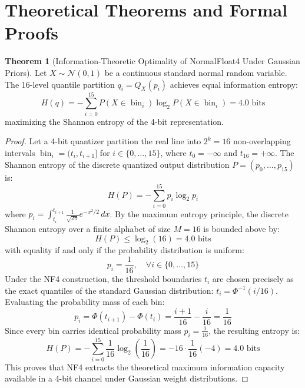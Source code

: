 \documentclass[11pt,a4paper]{article}
\theoremstyle{definition}
\newtheorem{theorem}{\textbf{Theorem}}[section]
\begin{document}
\section{Theoretical Theorems and Formal Proofs}

\begin{theorem}[Information-Theoretic Optimality of NormalFloat4 Under Gaussian Priors]
Let $X \sim \mathcal{N}(0, 1)$ be a continuous standard normal random variable. The 16-level quantile partition $q_i = Q_X(p_i)$ achieves equal information entropy:
{\boldmath
\begin{equation}
H(q) = -\sum_{i=0}^{15} P(X \in \operatorname{bin}_i) \log_2 P(X \in \operatorname{bin}_i) = 4.0 \text{ bits}
\end{equation}
}
maximizing the Shannon entropy of the 4-bit representation.
\end{theorem}

\begin{proof}
Let a 4-bit quantizer partition the real line into $2^k = 16$ non-overlapping intervals $\operatorname{bin}_i = (t_i, t_{i+1}]$ for $i \in \{0, \dots, 15\}$, where $t_0 = -\infty$ and $t_{16} = +\infty$.
The Shannon entropy of the discrete quantized output distribution $P = (p_0, \dots, p_{15})$ is:
{\boldmath
\begin{equation}
H(P) = -\sum_{i=0}^{15} p_i \log_2 p_i
\end{equation}
}
where $p_i = \int_{t_i}^{t_{i+1}} \frac{1}{\sqrt{2\pi}} e^{-x^2 / 2} \, dx$.
By the maximum entropy principle, the discrete Shannon entropy over a finite alphabet of size $M = 16$ is bounded above by:
{\boldmath
\begin{equation}
H(P) \le \log_2(16) = 4.0 \text{ bits}
\end{equation}
}
with equality if and only if the probability distribution is uniform:
{\boldmath
\begin{equation}
p_i = \frac{1}{16}, \quad \forall i \in \{0, \dots, 15\}
\end{equation}
}
Under the NF4 construction, the threshold boundaries $t_i$ are chosen precisely as the exact quantiles of the standard Gaussian distribution: $t_i = \Phi^{-1}(i / 16)$.
Evaluating the probability mass of each bin:
{\boldmath
\begin{equation}
p_i = \Phi(t_{i+1}) - \Phi(t_i) = \frac{i+1}{16} - \frac{i}{16} = \frac{1}{16}
\end{equation}
}
Since every bin carries identical probability mass $p_i = \frac{1}{16}$, the resulting entropy is:
{\boldmath
\begin{equation}
H(P) = -\sum_{i=0}^{15} \frac{1}{16} \log_2\left(\frac{1}{16}\right) = -16 \cdot \frac{1}{16} (-4) = 4.0 \text{ bits}
\end{equation}
}
This proves that NF4 extracts the theoretical maximum information capacity available in a 4-bit channel under Gaussian weight distributions.
\end{proof}
\end{document}
